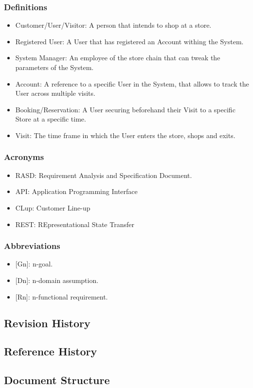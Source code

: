 \subsubsection{Definitions}
\begin{itemize}
    \item Customer/User/Visitor: A person that intends to shop at a store.
    \item Registered User: A User that has registered an Account withing the System.
    \item System Manager: An employee of the store chain that can tweak the parameters of the System.
    \item Account: A reference to a specific User in the System, that allows to track the User across multiple visits.
    \item Booking/Reservation: A User securing beforehand their Visit to a specific Store at a specific time.
    \item Visit: The time frame in which the User enters the store, shops and exits.
\end{itemize}

\subsubsection{Acronyms}
\begin{itemize}
    \item RASD: Requirement Analysis and Specification Document.
    \item API: Application Programming Interface
    \item CLup: Customer Line-up
    \item REST: REpresentational State Transfer
\end{itemize}


\subsubsection{Abbreviations}
\begin{itemize}
    \item {[Gn]}: n-goal.
    \item {[Dn]}: n-domain assumption.
    \item {[Rn]}: n-functional requirement.
\end{itemize}

\subsection{Revision History}
\subsection{Reference History}
\subsection{Document Structure}
